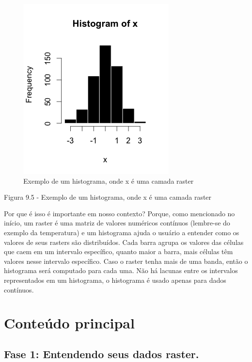 \documentclass[
]{book}
\begin{document}
\begin{figure}
\centering
\includegraphics{media/modulo9/fig95.png}
\caption{Exemplo de um histograma, onde x é uma camada raster}
\end{figure}

Figura 9.5 - Exemplo de um histograma, onde x é uma camada raster

Por que é isso é importante em nosso contexto? Porque, como mencionado no início, um raster é uma matriz de valores numéricos contínuos (lembre-se do exemplo da temperatura) e um histograma ajuda o usuário a entender como os valores de seus rasters são distribuídos. Cada barra agrupa os valores das células que caem em um intervalo específico, quanto maior a barra, mais células têm valores nesse intervalo específico. Caso o raster tenha mais de uma banda, então o histograma será computado para cada uma. Não há lacunas entre os intervalos representados em um histograma, o histograma é usado apenas para dados contínuos.

\hypertarget{conteuxfado-principal-8}{%
\section{Conteúdo principal}\label{conteuxfado-principal-8}}

\hypertarget{fase-1-entendendo-seus-dados-raster.}{%
\subsection{Fase 1: Entendendo seus dados raster.}\label{fase-1-entendendo-seus-dados-raster.}}
\end{document}
